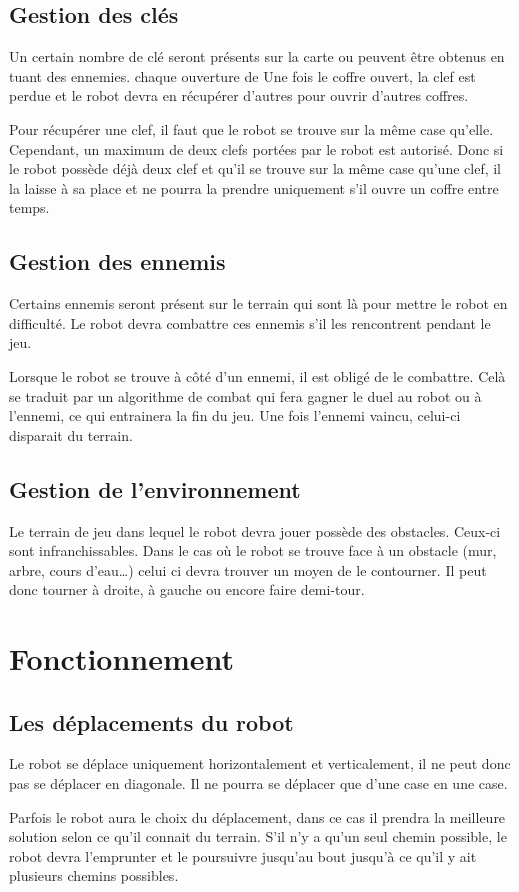 \documentclass[a4paper 12pts]{article}
\begin{document}

\subsection{Gestion des clés}


Un certain nombre de clé seront présents sur la carte ou peuvent être obtenus en tuant des ennemies.
chaque ouverture de 
Une fois le coffre ouvert, la clef est perdue et le robot devra en récupérer d'autres pour ouvrir d'autres coffres.

Pour récupérer une clef, il faut que le robot se trouve sur la même case qu'elle. Cependant, un maximum de deux clefs portées par le robot est autorisé. Donc si le robot possède déjà deux clef et qu'il se trouve sur la même case qu'une clef, il la laisse à sa place et ne pourra la prendre uniquement s'il ouvre un coffre entre temps.

\subsection{Gestion des ennemis}
Certains ennemis seront présent sur le terrain qui sont là pour mettre le robot en difficulté. Le robot devra combattre ces ennemis s'il les rencontrent pendant le jeu.

Lorsque le robot se trouve à côté d'un ennemi, il est obligé de le combattre. Celà se traduit par un algorithme de combat qui fera gagner le duel au robot ou à l'ennemi, ce qui entrainera la fin du jeu. Une fois l'ennemi vaincu, celui-ci disparait du terrain.

\subsection{Gestion de l'environnement}
Le terrain de jeu dans lequel le robot devra jouer possède des obstacles. Ceux-ci sont infranchissables. Dans le cas où le robot se trouve face à un obstacle (mur, arbre, cours d'eau\ldots) celui ci devra trouver un moyen de le contourner. Il peut donc tourner à droite, à gauche ou encore faire demi-tour.


\section{Fonctionnement}

\subsection{Les déplacements du robot}
Le robot se déplace uniquement horizontalement et verticalement, il ne peut donc pas se déplacer en diagonale. Il ne pourra se déplacer que d'une case en une case.

Parfois le robot aura le choix du déplacement, dans ce cas il prendra la meilleure solution selon ce qu'il connait du terrain. S'il n'y a qu'un seul chemin possible, le robot devra l'emprunter et le poursuivre jusqu'au bout jusqu'à ce qu'il y ait plusieurs chemins possibles.
\end{document}
